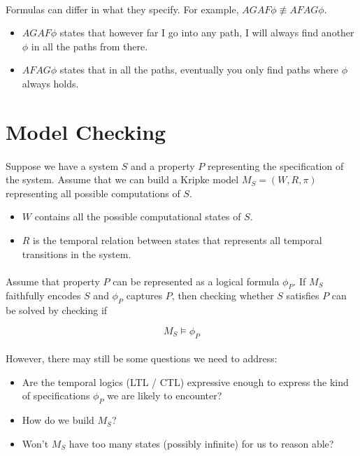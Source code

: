 \documentclass{article}
\theoremstyle{plain}
\theoremstyle{definition}
\begin{document}
\begin{multicols}{2}
\paragraph{} Formulas can differ in what they specify. For example, $AGAF\phi \not\equiv AFAG\phi$.

\begin{itemize}
\item $AGAF\phi$ states that however far I go into any path, I will always find another $\phi$ in all the paths from there. 
\item $AFAG\phi$ states that in all the paths, eventually you only find paths where $\phi$ always holds.
\end{itemize}


\section{Model Checking}

\paragraph{} Suppose we have a system $S$ and a property $P$ representing the specification of the system. Assume that we can build a Kripke model $M_S = (W, R, \pi)$ representing all possible computations of $S$. 

\begin{itemize}
\item $W$ contains all the possible computational states of $S$.
\item $R$ is the temporal relation between states that represents all temporal transitions in the system.
\end{itemize}

\paragraph{} Assume that property $P$ can be represented as a logical formula $\phi_P$. If $M_S$ faithfully encodes $S$ and $\phi_P$ captures $P$, then checking whether $S$ satisfies $P$ can be solved by checking if

$$M_S \models \phi_P$$

\paragraph{} However, there may still be some questions we need to address:

\begin{itemize}
\item Are the temporal logics (LTL / CTL) expressive enough to express the kind of specifications $\phi_P$ we are likely to encounter?
\item How do we build $M_S$?
\item Won't $M_S$ have too many states (possibly infinite) for us to reason able?
\end{itemize}


\end{multicols}
\end{document}
